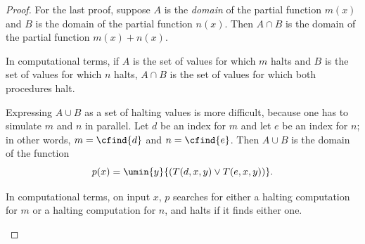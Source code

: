 \documentclass[../../../include/open-logic-section]{subfiles}
\begin{document}
\begin{proof}
For the last proof, suppose $A$ is the \emph{domain} of the partial
function $m(x)$ and $B$ is the domain of the partial function
$n(x)$. Then $A \cap B$ is the domain of the partial function $m(x) +
n(x)$.

\begin{explain}
In computational terms, if $A$ is the set of values for which
$m$ halts and $B$ is the set of values for which $n$ halts, $A \cap B$
is the set of values for which both procedures halt.
\end{explain}

Expressing $A \cup B$ as a set of halting values is more difficult,
because one has to simulate $m$ and $n$ in parallel. Let $d$ be an
index for $m$ and let $e$ be an index for $n$; in other words, $m =
\cfind{d}$ and $n = \cfind{e}$. Then $A \cup B$ is the domain of the
function
\[
p(x) = \umin{y}{(T(d,x,y) \lor T(e,x,y))}.
\]
\begin{explain}
In computational terms, on input $x$, $p$ searches for either a
halting computation for $m$ or a halting computation for $n$, and
halts if it finds either one.
\end{explain}
\end{proof}
\end{document}

